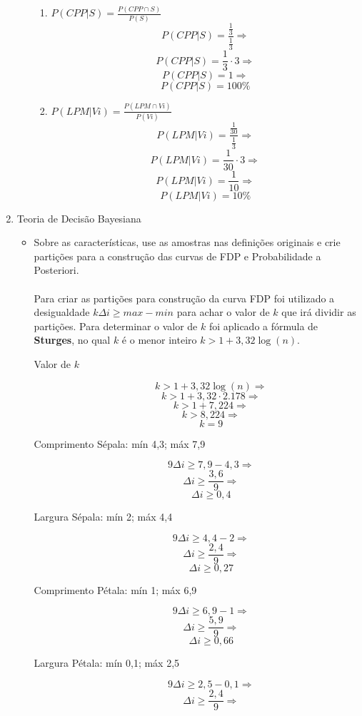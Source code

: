 \documentclass[a4paper, 12pt]{article}
\begin{document}
\begin{enumerate}
\begin{itemize}
\begin{enumerate}
  \item $P(CPP|S)=\frac{P(CPP \cap S)}{P(S)}$
   $$P(CPP|S)=\frac{\frac{1}{3}}{\frac{1}{3}} \Rightarrow$$
   $$P(CPP|S)=\frac{1}{3}\cdot3 \Rightarrow$$
   $$P(CPP|S)=1 \Rightarrow$$
   $$\boxed{P(CPP|S)=100\%} $$
     
  \item $P(LPM|Vi)=\frac{P(LPM \cap Vi)}{P(Vi)}$
   $$P(LPM|Vi)=\frac{\frac{1}{30}}{\frac{1}{3}} \Rightarrow$$
   $$P(LPM|Vi)=\frac{1}{30}\cdot3 \Rightarrow$$
   $$P(LPM|Vi)=\frac{1}{10} \Rightarrow$$
   $$\boxed{P(LPM|Vi)=10\%} $$
     
  \end{enumerate}
  

\end{itemize}
\item Teoria de Decisão Bayesiana
  \begin{itemize}
  \item Sobre as características, use as amostras nas definições originais e crie partições para a construção das curvas de FDP e Probabilidade a Posteriori.\\\\
    Para criar as partições para construção da curva FDP foi utilizado a desigualdade $k\Delta i \ge max-min$ para achar o valor de $k$ que irá dividir as partições. Para determinar o valor de $k$ foi aplicado a fórmula de \textbf{Sturges}, no qual $k$ é o menor inteiro $k>1+3,32\log(n)$.\\
    \begin{description}
    \item[Valor de $k$]
      $$k>1+3,32\log(n) \Rightarrow$$
      $$k>1+3,32\cdot2.178 \Rightarrow$$
      $$k>1+7,224 \Rightarrow $$
      $$k>8,224 \Rightarrow $$
      $$\boxed{k=9} $$
    \item[Comprimento Sépala: mín 4,3; máx 7,9]
      $$9\Delta i \ge 7,9 - 4,3 \Rightarrow $$
      $$\Delta i \ge \frac{3,6}{9} \Rightarrow $$
      $$ \boxed{\Delta i \ge 0,4} $$
    \item[Largura Sépala: mín 2; máx 4,4]
      $$9\Delta i \ge 4,4 - 2 \Rightarrow $$
      $$\Delta i \ge \frac{2,4}{9} \Rightarrow $$
      $$\boxed{\Delta i \ge 0,27}$$
    \item[Comprimento Pétala: mín 1; máx 6,9]
      $$9\Delta i \ge 6,9 - 1 \Rightarrow $$
      $$\Delta i \ge \frac{5,9}{9} \Rightarrow $$
      $$\boxed{\Delta i \ge 0,66}$$
    \item[Largura Pétala: mín 0,1; máx 2,5]
      $$9\Delta i \ge 2,5 - 0,1 \Rightarrow $$
      $$\Delta i \ge \frac{2,4}{9} \Rightarrow $$

\end{description}
\end{itemize}
\end{enumerate}
\end{document}
